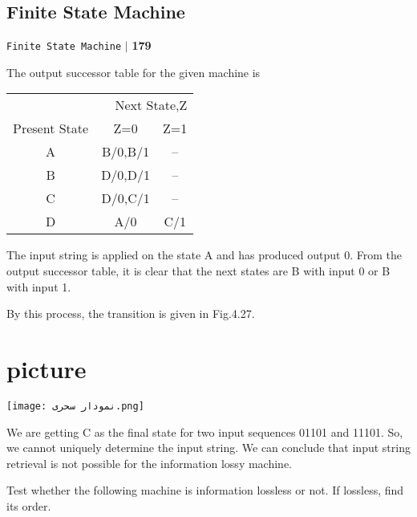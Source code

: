\documentclass[a4,9pt]{beamer}
\begin{document}
\begin{frame}
\section*{Finite State Machine}
\begin{flushright}
\texttt{Finite State Machine} \hspace*{0.1cm}\textbf{$|$} \hspace*{0.1cm} \textbf{179}\hspace*{0.1cm}
\end{flushright}
\vspace*{1cm}

The output successor table for the given machine is

\pause
\begin{center}
\begin{tabular}{ccc}
\hline

\hline

\hline

\hline
  \multicolumn{3}{r}{{Next State,Z}}\\
 \cline{2-3}
{Present State} & {Z=0} & {Z=1}\\
\hline
 A & B/0,B/1 & -- \\
 B & D/0,D/1 & -- \\
 C & D/0,C/1 & -- \\
 D &  A/0    & C/1\\
\hline

\hline

\hline

\hline
\end{tabular}
\end{center}

\pause
The input string is applied on the state A and has produced output 0. From the output successor table, it is clear that the next states are B with input 0 or B with input 1.
\end{frame}

\begin{frame}
By this process, the transition is given in Fig.4.27.
\pause
\section{picture}
\texttt{[image: نمودار  سحری.png]}

\end{frame}

\begin{frame}
We are getting C as the final state for two input sequences 01101 and 11101. So, we cannot uniquely determine the input string. We can conclude that input string retrieval is not possible for the information lossy machine.

\pause
\vspace*{1cm}
 \hspace*{0.2cm} Test whether the following machine is information lossless or not. If lossless, find its order.
\end{frame}
\end{document}
